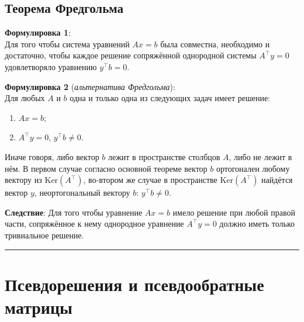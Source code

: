 \documentclass[11pt,a4paper]{article}
\providecommand{\tightlist}{%
      \setlength{\itemsep}{0pt}\setlength{\parskip}{0pt}}
\begin{document}
    \hypertarget{ux442ux435ux43eux440ux435ux43cux430-ux444ux440ux435ux434ux433ux43eux43bux44cux43cux430}{%
\subsection{Теорема
Фредгольма}\label{ux442ux435ux43eux440ux435ux43cux430-ux444ux440ux435ux434ux433ux43eux43bux44cux43cux430}}

\textbf{Формулировка 1}:\\
Для того чтобы система уравнений \(Ax=b\) была совместна, необходимо и
достаточно, чтобы каждое решение сопряжённой однородной системы
\(A^\top y = 0\) удовлетворяло уравнению \(y^\top b = 0\).

\textbf{Формулировка 2} (\emph{альтернатива Фредгольма}):\\
Для любых \(A\) и \(b\) одна и только одна из следующих задач имеет
решение:

\begin{enumerate}
\def\labelenumi{\arabic{enumi}.}
\tightlist
\item
  \(Ax = b\);
\item
  \(A^\top y = 0\), \(y^\top b \ne 0\).
\end{enumerate}

Иначе говоря, либо вектор \(b\) лежит в пространстве столбцов \(A\),
либо не лежит в нём. В первом случае согласно основной теореме вектор
\(b\) ортогонален любому вектору из \(\mathrm{Ker}(A^\top)\), во-втором
же случае в пространстве \(\mathrm{Ker}(A^\top)\) найдётся вектор \(y\),
неортогональный вектору \(b\): \(y^\top b \ne 0\).

\textbf{Следствие}: Для того чтобы уравнение \(Ax=b\) имело решение при
любой правой части, сопряжённое к нему однородное уравнение
\(A^\top y = 0\) должно иметь только тривиальное решение.

    \begin{center}\rule{0.5\linewidth}{0.5pt}\end{center}

    \hypertarget{ux43fux441ux435ux432ux434ux43eux440ux435ux448ux435ux43dux438ux44f-ux438-ux43fux441ux435ux432ux434ux43eux43eux431ux440ux430ux442ux43dux44bux435-ux43cux430ux442ux440ux438ux446ux44b}{%
\section{Псевдорешения и псевдообратные
матрицы}\label{ux43fux441ux435ux432ux434ux43eux440ux435ux448ux435ux43dux438ux44f-ux438-ux43fux441ux435ux432ux434ux43eux43eux431ux440ux430ux442ux43dux44bux435-ux43cux430ux442ux440ux438ux446ux44b}}
\end{document}
